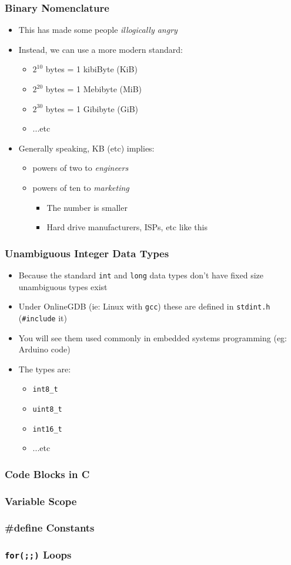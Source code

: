 \documentclass[14pt]{beamer}
\begin{document}
\begin{frame}
\frametitle{Binary Nomenclature}
\begin{itemize}
\item This has made some people \textit{illogically angry}
\item Instead, we can use a more modern standard:
	\begin{itemize}
		\item $2^{10}$ bytes = 1 kibiByte (KiB)
		\item $2^{20}$ bytes = 1 Mebibyte (MiB)
		\item $2^{30}$ bytes = 1 Gibibyte (GiB)
		\item ...etc
	\end{itemize}
\item Generally speaking, KB (etc) implies:
	\begin{itemize}
		\item powers of two to \textit{engineers}
		\item powers of ten to \textit{marketing}
			\begin{itemize}
				\item The number is smaller
				\item Hard drive manufacturers, ISPs, etc like this
			\end{itemize}
	\end{itemize}
\end{itemize}
\end{frame}

\begin{frame}
\frametitle{Unambiguous Integer Data Types}
\begin{itemize}
\item Because the standard \texttt{int} and \texttt{long} data types don't have fixed size unambiguous types exist
\item Under OnlineGDB (ie: Linux with \texttt{gcc}) these are defined in \texttt{stdint.h} (\texttt{\#include} it)
\item You will see them used commonly in embedded systems programming (eg: Arduino code)
\item The types are:
	\begin{itemize}
		\item \texttt{int8\_t}
		\item \texttt{uint8\_t}
		\item \texttt{int16\_t}
		\item ...etc
	\end{itemize}
\end{itemize}
\end{frame}

\begin{frame}
\frametitle{Code Blocks in C}
\end{frame}

\begin{frame}
\frametitle{Variable Scope}
\end{frame}

\begin{frame}
\frametitle{\#define Constants}
\end{frame}

\begin{frame}
\frametitle{\texttt{for(;;)} Loops}
\end{frame}
\end{document}
